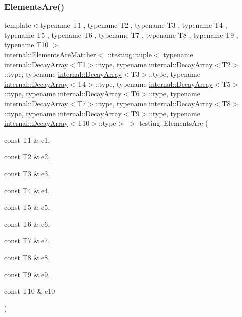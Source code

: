 \subsubsection{\texorpdfstring{ElementsAre()}{ElementsAre()}\hspace{0.1cm}{\footnotesize\ttfamily [11/11]}}
{\footnotesize\ttfamily template$<$typename T1 , typename T2 , typename T3 , typename T4 , typename T5 , typename T6 , typename T7 , typename T8 , typename T9 , typename T10 $>$ \\
internal\+::\+Elements\+Are\+Matcher$<$ \+::testing\+::tuple$<$ typename \mbox{\hyperlink{structtesting_1_1internal_1_1DecayArray}{internal\+::\+Decay\+Array}}$<$T1$>$\+::type, typename \mbox{\hyperlink{structtesting_1_1internal_1_1DecayArray}{internal\+::\+Decay\+Array}}$<$T2$>$\+::type, typename \mbox{\hyperlink{structtesting_1_1internal_1_1DecayArray}{internal\+::\+Decay\+Array}}$<$T3$>$\+::type, typename \mbox{\hyperlink{structtesting_1_1internal_1_1DecayArray}{internal\+::\+Decay\+Array}}$<$T4$>$\+::type, typename \mbox{\hyperlink{structtesting_1_1internal_1_1DecayArray}{internal\+::\+Decay\+Array}}$<$T5$>$\+::type, typename \mbox{\hyperlink{structtesting_1_1internal_1_1DecayArray}{internal\+::\+Decay\+Array}}$<$T6$>$\+::type, typename \mbox{\hyperlink{structtesting_1_1internal_1_1DecayArray}{internal\+::\+Decay\+Array}}$<$T7$>$\+::type, typename \mbox{\hyperlink{structtesting_1_1internal_1_1DecayArray}{internal\+::\+Decay\+Array}}$<$T8$>$\+::type, typename \mbox{\hyperlink{structtesting_1_1internal_1_1DecayArray}{internal\+::\+Decay\+Array}}$<$T9$>$\+::type, typename \mbox{\hyperlink{structtesting_1_1internal_1_1DecayArray}{internal\+::\+Decay\+Array}}$<$T10$>$\+::type$>$ $>$ testing\+::\+Elements\+Are (\begin{DoxyParamCaption}\item[{const T1 \&}]{e1,  }\item[{const T2 \&}]{e2,  }\item[{const T3 \&}]{e3,  }\item[{const T4 \&}]{e4,  }\item[{const T5 \&}]{e5,  }\item[{const T6 \&}]{e6,  }\item[{const T7 \&}]{e7,  }\item[{const T8 \&}]{e8,  }\item[{const T9 \&}]{e9,  }\item[{const T10 \&}]{e10 }\end{DoxyParamCaption})\hspace{0.3cm}{\ttfamily [inline]}}


